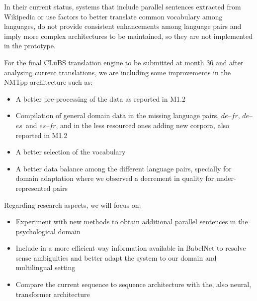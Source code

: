 \documentclass[a4paper,11pt]{article}
\newcommand{\es}{$es$}
\newcommand{\fr}{$fr$}
\newcommand{\de}{$de$}
\begin{document}
In their current status, systems that include parallel sentences extracted from Wikipedia or use factors to better translate common vocabulary among languages, do not provide consistent enhancements among language pairs and imply more complex architectures to be maintained, so they are not implemented in the prototype.

\medskip
For the final CLuBS translation engine to be submitted at month 36 and after analysing current translations, we are including some improvements in the NMTpp architecture such as:
\begin{itemize}
 \setlength\itemsep{0.2em}
 \item A better pre-processing of the data as reported in M1.2
 \item Compilation of general domain data in the missing language pairs, \de--\fr, \de--\es\ and \es--\fr, and in the less resourced ones adding new corpora, also reported in M1.2
 \item A better selection of the vocabulary
 \item A better data balance among the different language pairs, specially for domain adaptation where we observed a decrement in quality for under-represented pairs
\end{itemize}

\medskip
\noindent
Regarding research aspects, we will focus on:
\begin{itemize}
 \setlength\itemsep{0.2em}
 \item Experiment with new methods to obtain additional parallel sentences in the psychological domain 
 \item Include in a more efficient way information available in BabelNet to resolve sense ambiguities and better adapt the system to our domain and multilingual setting
 \item Compare the current sequence to sequence architecture with the, also neural, transformer architecture
\end{itemize}


%
%


\end{document}
